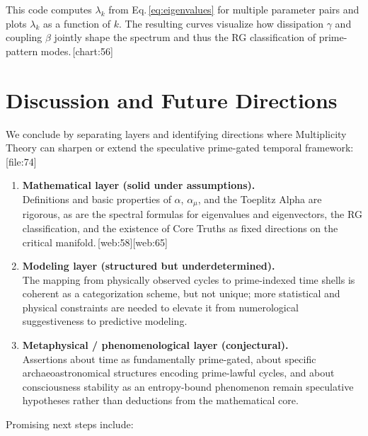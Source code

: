 \documentclass[11pt]{article}
\begin{document}
This code computes \(\lambda_k\) from Eq.\,\eqref{eq:eigenvalues} for multiple parameter pairs and plots \(\lambda_k\) as a function of \(k\). The resulting curves visualize how dissipation \(\gamma\) and coupling \(\beta\) jointly shape the spectrum and thus the RG classification of prime-pattern modes.\,[chart:56]

\section{Discussion and Future Directions}

We conclude by separating layers and identifying directions where Multiplicity Theory can sharpen or extend the speculative prime-gated temporal framework:\,[file:74]

\begin{enumerate}
  \item \textbf{Mathematical layer (solid under assumptions).}\\
  Definitions and basic properties of \(\alpha\), \(\alpha_\mu\), and the Toeplitz Alpha are rigorous, as are the spectral formulas for eigenvalues and eigenvectors, the RG classification, and the existence of Core Truths as fixed directions on the critical manifold.\,[web:58][web:65]
  \item \textbf{Modeling layer (structured but underdetermined).}\\
  The mapping from physically observed cycles to prime-indexed time shells is coherent as a categorization scheme, but not unique; more statistical and physical constraints are needed to elevate it from numerological suggestiveness to predictive modeling.
  \item \textbf{Metaphysical / phenomenological layer (conjectural).}\\
  Assertions about time as fundamentally prime-gated, about specific archaeoastronomical structures encoding prime-lawful cycles, and about consciousness stability as an entropy-bound phenomenon remain speculative hypotheses rather than deductions from the mathematical core.
\end{enumerate}

Promising next steps include:
\end{document}
